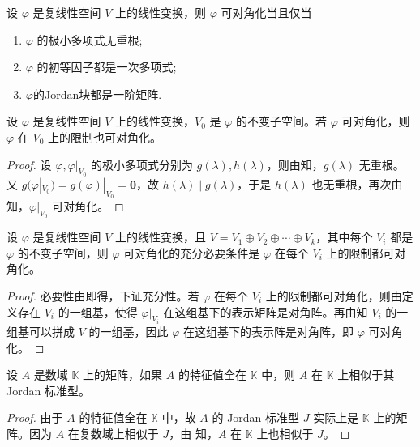 \documentclass[../../main.tex]{subfiles}
\begin{document}
\begin{corollary}\label{corollary:矩阵可对角化的几何叙述}
设 $\varphi$ 是复线性空间 $V$ 上的线性变换，则 $\varphi$ 可对角化当且仅当
\begin{enumerate}
\item $\varphi$ 的极小多项式无重根;

\item $\varphi$ 的初等因子都是一次多项式;

\item $\varphi$的Jordan块都是一阶矩阵.
\end{enumerate}
\end{corollary}

\begin{corollary}\label{corollary:线性变换可对角化则其在不变子空间的限制上也可对角化}
设 $\varphi$ 是复线性空间 $V$ 上的线性变换，$V_0$ 是 $\varphi$ 的不变子空间。若 $\varphi$ 可对角化，则 $\varphi$ 在 $V_0$ 上的限制也可对角化。
\end{corollary}
\begin{proof}
设 $\varphi,\varphi|_{V_0}$ 的极小多项式分别为 $g(\lambda),h(\lambda)$，则由知，$g(\lambda)$ 无重根。又 $g(\varphi|_{V_0}) = g(\varphi)|_{V_0} = \mathbf{0}$，故 $h(\lambda)\mid g(\lambda)$，于是 $h(\lambda)$ 也无重根，再次由知，$\varphi|_{V_0}$ 可对角化。

\end{proof}

\begin{corollary}\label{corollary:线性变换可对角化关于在直和分解限制的充要条件}
设 $\varphi$ 是复线性空间 $V$ 上的线性变换，且 $V = V_1\oplus V_2\oplus\cdots\oplus V_k$，其中每个 $V_i$ 都是 $\varphi$ 的不变子空间，则 $\varphi$ 可对角化的充分必要条件是 $\varphi$ 在每个 $V_i$ 上的限制都可对角化。
\end{corollary}
\begin{proof}
必要性由即得，下证充分性。若 $\varphi$ 在每个 $V_i$ 上的限制都可对角化，则由定义存在 $V_i$ 的一组基，使得 $\varphi|_{V_i}$ 在这组基下的表示矩阵是对角阵。再由知 $V_i$ 的一组基可以拼成 $V$ 的一组基，因此 $\varphi$ 在这组基下的表示阵是对角阵，即 $\varphi$ 可对角化。

\end{proof}

\begin{corollary}
设 $A$ 是数域 $\mathbb{K}$ 上的矩阵，如果 $A$ 的特征值全在 $\mathbb{K}$ 中，则 $A$ 在 $\mathbb{K}$ 上相似于其 Jordan 标准型。
\end{corollary}
\begin{proof}
由于 $A$ 的特征值全在 $\mathbb{K}$ 中，故 $A$ 的 Jordan 标准型 $J$ 实际上是 $\mathbb{K}$ 上的矩阵。因为 $A$ 在复数域上相似于 $J$，由 知，$A$ 在 $\mathbb{K}$ 上也相似于 $J$。

\end{proof}
\end{document}
